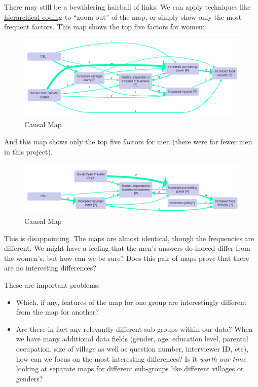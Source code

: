 \documentclass[
]{book}
\begin{document}
There may still be a bewildering hairball of links. We can apply techniques like \href{https://causalmapdocumentation.blot.im/simplifying-causal-maps-with-hierarchical-coding}{hierarchical coding} to ``zoom out'' of the map, or simply show only the most frequent factors. This map shows the top five factors for women:

\begin{figure}
\centering
\includegraphics{_assets/women.png}
\caption{Causal Map}
\end{figure}

And this map shows only the top five factors for men (there were far fewer men in this project).

\begin{figure}
\centering
\includegraphics{_assets/men.png}
\caption{Causal Map}
\end{figure}

This is disappointing. The maps are almost identical, though the frequencies are different. We might have a feeling that the men's answers do indeed differ from the women's, but how can we be sure? Does this pair of maps prove that there are no interesting differences?

These are important problems:

\begin{itemize}
\item
  Which, if any, features of the map for one group are interestingly different from the map for another?
\item
  Are there in fact any relevantly different sub-groups within our data? When we have many additional data fields (gender, age, education level, parental occupation, size of village as well as question number, interviewer ID, etc), how can we focus on the most interesting differences? Is it \emph{worth our time} looking at separate maps for different sub-groups like different villages or genders?
\end{itemize}
\end{document}
